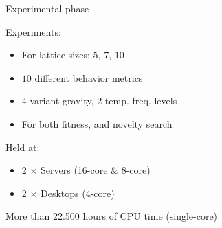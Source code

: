 \documentclass[6pt]{beamer}
\begin{document}

\begin{frame}{Experimental phase}
\begin{block}{Experiments:}
\begin{itemize}
\item For lattice sizes: 5, 7, 10
\item $10$ different behavior metrics
\item $4$ variant gravity, $2$ temp. freq. levels
\item For both fitness, and novelty search
\end{itemize}
\end{block}
\begin{block}{Held at:}
\begin{itemize}
\item 2 $\times$ Servers (16-core \& 8-core)
\item 2 $\times$ Desktops (4-core)
\end{itemize}
\end{block}
\alert{More than 22.500 hours of CPU time (single-core)}
\end{frame}
\end{document}
